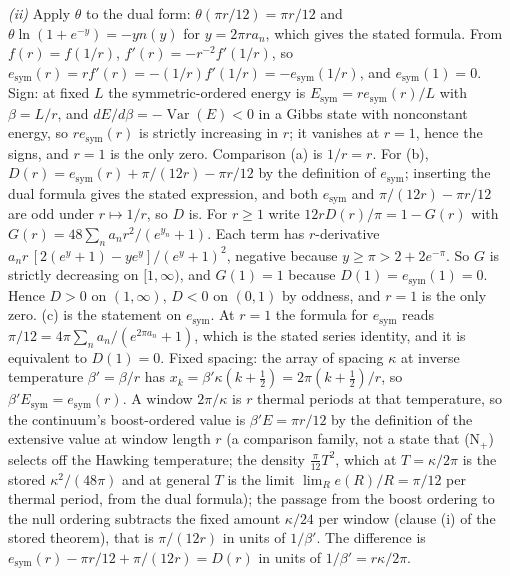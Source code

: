 \emph{(ii)} Apply $\theta$ to the dual form: $\theta(\pi r/12) = \pi r/12$ and $\theta\ln(1 + e^{-y}) = -yn(y)$ for $y = 2\pi ra_{n}$, which gives the stated formula. From $f(r) = f(1/r)$, $f'(r) = -r^{-2}f'(1/r)$, so $e_{\mathrm{sym}}(r) = rf'(r) = -(1/r)f'(1/r) = -e_{\mathrm{sym}}(1/r)$, and $e_{\mathrm{sym}}(1) = 0$. Sign: at fixed $L$ the symmetric-ordered energy is $E_{\mathrm{sym}} = re_{\mathrm{sym}}(r)/L$ with $\beta = L/r$, and $dE/d\beta = -\operatorname{Var}(E) < 0$ in a Gibbs state with nonconstant energy, so $re_{\mathrm{sym}}(r)$ is strictly increasing in $r$; it vanishes at $r = 1$, hence the signs, and $r = 1$ is the only zero. Comparison (a) is $1/r = r$. For (b), $D(r) = e_{\mathrm{sym}}(r) + \pi/(12r) - \pi r/12$ by the definition of $e_{\mathrm{sym}}$; inserting the dual formula gives the stated expression, and both $e_{\mathrm{sym}}$ and $\pi/(12r) - \pi r/12$ are odd under $r \mapsto 1/r$, so $D$ is. For $r \ge 1$ write $12rD(r)/\pi = 1 - G(r)$ with $G(r) = 48\sum_{n}a_{n}r^{2}/(e^{y_{n}} + 1)$. Each term has $r$-derivative $a_{n}r\,[2(e^{y} + 1) - ye^{y}]/(e^{y} + 1)^{2}$, negative because $y \ge \pi > 2 + 2e^{-\pi}$. So $G$ is strictly decreasing on $[1, \infty)$, and $G(1) = 1$ because $D(1) = e_{\mathrm{sym}}(1) = 0$. Hence $D > 0$ on $(1, \infty)$, $D < 0$ on $(0, 1)$ by oddness, and $r = 1$ is the only zero. (c) is the statement on $e_{\mathrm{sym}}$. At $r = 1$ the formula for $e_{\mathrm{sym}}$ reads $\pi/12 = 4\pi\sum_{n}a_{n}/(e^{2\pi a_{n}} + 1)$, which is the stated series identity, and it is equivalent to $D(1) = 0$. Fixed spacing: the array of spacing $\kappa$ at inverse temperature $\beta' = \beta/r$ has $x_{k} = \beta'\kappa(k + \tfrac12) = 2\pi(k + \tfrac12)/r$, so $\beta'E_{\mathrm{sym}} = e_{\mathrm{sym}}(r)$. A window $2\pi/\kappa$ is $r$ thermal periods at that temperature, so the continuum's boost-ordered value is $\beta'E = \pi r/12$ by the definition of the extensive value at window length $r$ (a comparison family, not a state that (N$_{+}$) selects off the Hawking temperature; the density $\tfrac{\pi}{12}T^{2}$, which at $T = \kappa/2\pi$ is the stored $\kappa^{2}/(48\pi)$ and at general $T$ is the limit $\lim_{R}e(R)/R = \pi/12$ per thermal period, from the dual formula); the passage from the boost ordering to the null ordering subtracts the fixed amount $\kappa/24$ per window (clause (i) of the stored theorem), that is $\pi/(12r)$ in units of $1/\beta'$. The difference is $e_{\mathrm{sym}}(r) - \pi r/12 + \pi/(12r) = D(r)$ in units of $1/\beta' = r\kappa/2\pi$.

